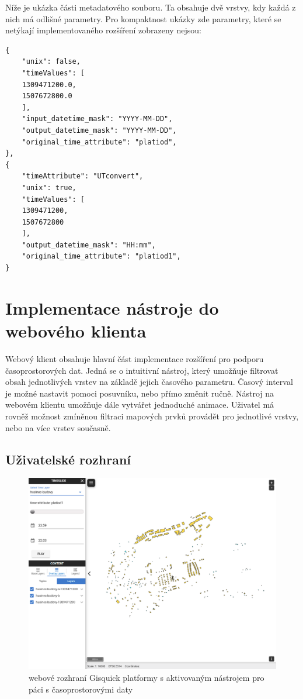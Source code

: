 \newpage
\bigskip
\noindent

Níže je ukázka části metadatového souboru. Ta obsahuje dvě vrstvy, kdy každá z nich má odlišné parametry. Pro kompaktnost ukázky zde parametry, které se netýkají implementovaného rozšíření zobrazeny nejsou: 

\begin{verbatim}
{
	"unix": false, 
	"timeValues": [
	1309471200.0, 
	1507672800.0
	], 
	"input_datetime_mask": "YYYY-MM-DD", 
	"output_datetime_mask": "YYYY-MM-DD", 
	"original_time_attribute": "platiod", 
}, 
{
	"timeAttribute": "UTconvert", 
	"unix": true, 
	"timeValues": [
	1309471200, 
	1507672800
	], 
	"output_datetime_mask": "HH:mm", 
	"original_time_attribute": "platiod1", 
}
\end{verbatim}

\newpage
\section{Implementace nástroje do webového klienta}
Webový klient obsahuje hlavní část implementace rozšíření pro podporu časoprostorových dat. Jedná se o intuitivní nástroj, který umožňuje filtrovat obsah jednotlivých vrstev na základě jejich časového parametru. Časový interval je možné nastavit pomoci posuvníku, nebo přímo změnit ručně. Nástroj na webovém klientu umožňuje dále vytvářet jednoduché animace. Uživatel má rovněž možnost zmíněnou filtraci mapových prvků provádět pro jednotlivé vrstvy, nebo na více vrstev současně. 

\subsection{Uživatelské rozhraní}

\begin{figure}[h!]
	\centering
	\includegraphics[width=1\textwidth]{../img/gisquick-time-tool.png}
	\caption{webové rozhraní Gisquick platformy s aktivovaným nástrojem pro páci s časoprostorovými daty}
	\label{fig:arcgis-time-settings}
\end{figure}

